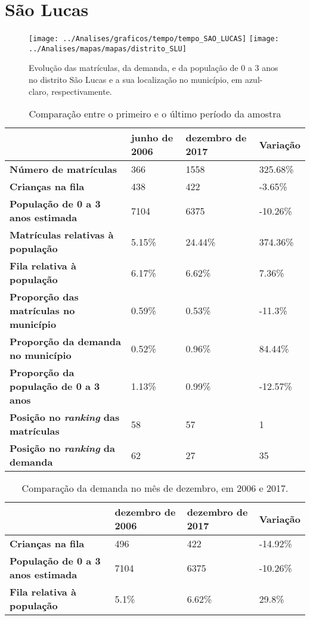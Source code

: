 \section{São Lucas}
\begin{figure}[H]
\centering
\texttt{[image: ../Analises/graficos/tempo/tempo\_SAO\_LUCAS]}
\texttt{[image: ../Analises/mapas/mapas/distrito\_SLU]}
\caption{Evolução das matrículas, da demanda, e da população de 0 a 3 anos no distrito São Lucas e a sua localização no município, em azul-claro, respectivamente.}
\end{figure}
\begin{table}[H]
\begin{tabular}{l|l|l|l}
\textbf{}                                      & \textbf{junho de 2006}       & \textbf{dezembro de 2017}    & \textbf{Variação} \\ \hline
\textbf{Número de matrículas}                  & 366 & 1558 & 325.68\% \\ \hline
\textbf{Crianças na fila}                      & 438 & 422 & -3.65\% \\ \hline
\textbf{População de 0 a 3 anos estimada}      & 7104 & 6375 & -10.26\% \\ \hline
\textbf{Matrículas relativas à população}      & 5.15\% & 24.44\% & 374.36\% \\ \hline
\textbf{Fila relativa à população}             & 6.17\% & 6.62\% & 7.36\% \\ \hline
\textbf{Proporção das matrículas no município} & 0.59\% & 0.53\% & -11.3\% \\ \hline
\textbf{Proporção da demanda no município}     & 0.52\% & 0.96\% & 84.44\% \\ \hline
\textbf{Proporção da população de 0 a 3 anos}  & 1.13\% & 0.99\% & -12.57\% \\ \hline
\textbf{Posição no \textit{ranking} das matrículas}     & 58 & 57 & 1 \\ \hline
\textbf{Posição no \textit{ranking} da demanda}         & 62 & 27 & 35 \\ 
\end{tabular}
\caption{Comparação entre o primeiro e o último período da amostra}
\end{table}
\begin{table}[H]
\begin{tabular}{l|l|l|l}
\textbf{}                                 & \textbf{dezembro de 2006} & \textbf{dezembro de 2017} & \textbf{Variação} \\ \hline
\textbf{Crianças na fila}                      & 496 & 422 & -14.92\% \\ \hline
\textbf{População de 0 a 3 anos estimada}      & 7104 & 6375 & -10.26\% \\ \hline
\textbf{Fila relativa à população}             & 5.1\% & 6.62\% & 29.8\% \\
\end{tabular}
\caption{Comparação da demanda no mês de dezembro, em 2006 e 2017.}
\end{table}
